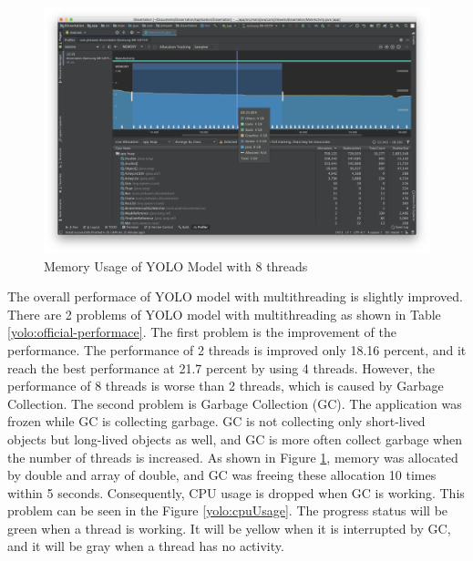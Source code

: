             \begin{figure}[!ht]
                \includegraphics[width=6in]{images/chapter5/gc-problem/gc-collecting.png}
                \caption{Memory Usage of YOLO Model with 8 threads}
                \label{yolo:memoryUsage}
            \end{figure}

            The overall performace of YOLO model with multithreading is slightly improved.
            There are 2 problems of YOLO model with multithreading as shown in Table \ref{yolo:official-performace}.
            The first problem is the improvement of the performance.
                The performance of 2 threads is improved only 18.16 percent, and it reach the best performance at 21.7 percent by using 4 threads.
                However, the performance of 8 threads is worse than 2 threads, which is caused by Garbage Collection.
            The second problem is Garbage Collection (GC).
                The application was frozen while GC is collecting garbage.
                GC is not collecting only short-lived objects but long-lived objects as well,
                and GC is more often collect garbage when the number of threads is increased.
                As shown in Figure \ref{yolo:memoryUsage}, memory was allocated by double and array of double,
                and GC was freeing these allocation 10 times within 5 seconds.
                Consequently, CPU usage is dropped when GC is working.
                This problem can be seen in the Figure \ref{yolo:cpuUsage}.
                The progress status will be green when a thread is working.
                It will be yellow when it is interrupted by GC,
                and it will be gray when a thread has no activity.


